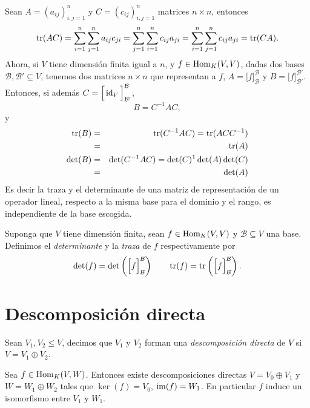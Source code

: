 \begin{obs}
Sean $A=(a_{ij})_{i,j=1}^n$ y $C=(c_{ij})_{i,j=1}^n$ matrices $n\times n$, entonces
\[
\operatorname{tr}(AC)=\sum_{i=1}^n\sum_{j=1}^na_{ij}c_{ji}=\sum_{j=1}^n\sum_{i=1}^nc_{ij}a_{ji}=\sum_{i=1}^n\sum_{j=1}^nc_{ij}a_{ji}=\operatorname{tr}(CA).
\]
Ahora, si $V$ tiene dimensi\'on finita igual a $n$, y $f\in\operatorname{Hom}_K(V,V)$, dadas dos bases $\mathcal{B},\mathcal{B}'\subseteq V$, tenemos dos matrices $n\times n$ que representan a $f$, $A=\Big[f\Big]^{\mathcal{B}}_{\mathcal{B}}$ y $B=\Big[f\Big]^{\mathcal{B}'}_{\mathcal{B}'}$. Entonces, si adem\'as $C=\Big[\operatorname{id}_V\Big]_{\mathcal{B}'}^{\mathcal{B}}$,
\[
B=C^{-1}AC,
\]
y
\begin{eqnarray*}
\operatorname{tr}(B) & = &\operatorname{tr}(C^{-1}AC)=\operatorname{tr}(ACC^{-1})\\
         & = &\operatorname{tr}(A)\\
\det(B) & = & \det(C^{-1}AC)=\det(C)^{1}\det(A)\det(C)\\
           & = &\det(A)
\end{eqnarray*}
Es decir la traza y el determinante de una matriz de representaci\'on de un operador lineal, respecto a la misma base para el dominio y el rango, es independiente de la base escogida.
\end{obs}

\begin{defn}
Suponga que $V$ tiene dimensi\'on finita, sean $f\in\operatorname{Hom}_K(V,V)$ y $\mathcal{B}\subseteq V$ una base. Definimos el \emph{determinante} y la \emph{traza} de $f$ respectivamente por
\[
\det(f)=\det\left(\Big[f\Big]^{\mathcal{B}}_{\mathcal{B}}\right)\qquad \operatorname{tr}(f)=\operatorname{tr}\left(\Big[f\Big]^{\mathcal{B}}_{\mathcal{B}}\right).
\]
\end{defn}

\section{Descomposici\'on directa}

\begin{defn}
Sean $V_1,V_2\le V$, decimos que $V_1$ y $V_2$ forman una \emph{descomposici\'on directa} de $V$ si $V=V_1\oplus V_2$.
\end{defn}

\begin{teo}
Sea $f\in\operatorname{Hom}_K(V,W)$. Entonces existe descomposiciones directas $V=V_0\oplus V_1$ y $W=W_1\oplus W_2$ tales que $\ker(f)=V_0$, $\operatorname{im}(f)=W_1$. En particular $f$ induce un isomorfismo entre $V_1$ y $W_1$.
\end{teo}

